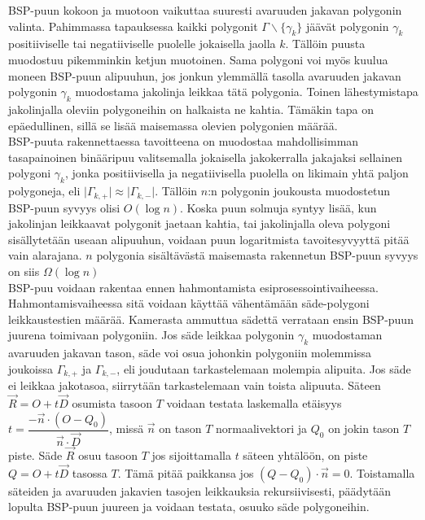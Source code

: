 \documentclass[a4paper, 12pt, titlepage]{article}
\newcommand{\abs}[1]{\vert #1 \vert} %
\begin{document}
BSP-puun kokoon ja muotoon vaikuttaa suuresti avaruuden jakavan polygonin valinta. Pahimmassa tapauksessa kaikki polygonit $\Gamma\backslash\{\gamma_k\}$ jäävät polygonin $\gamma_k$ positiiviselle tai negatiiviselle puolelle jokaisella jaolla $k$. Tällöin puusta muodostuu pikemminkin ketjun muotoinen. Sama polygoni voi myös kuulua moneen BSP-puun alipuuhun, jos jonkun ylemmällä tasolla avaruuden jakavan polygonin $\gamma_k$ muodostama jakolinja leikkaa tätä polygonia. \citep[.]{samet} Toinen lähestymistapa jakolinjalla oleviin polygoneihin on halkaista ne kahtia. Tämäkin tapa on epäedullinen, sillä se lisää maisemassa olevien polygonien määrää. \citep[.]{ranta}\\ %



BSP-puuta rakennettaessa tavoitteena on muodostaa mahdollisimman tasapainoinen binääripuu valitsemalla jokaisella jakokerralla jakajaksi sellainen polygoni $\gamma_k$, jonka positiivisella ja negatiivisella puolella on likimain yhtä paljon polygoneja, eli $\abs{\Gamma_{k,+}} \approx \abs{\Gamma_{k,-}}$. Tällöin  $n$:n polygonin joukousta muodostetun BSP-puun syvyys olisi $O(\log n)$. Koska puun solmuja syntyy lisää, kun jakolinjan leikkaavat polygonit jaetaan kahtia, tai jakolinjalla oleva polygoni sisällytetään useaan alipuuhun, voidaan puun logaritmista tavoitesyvyyttä pitää vain alarajana. \citep[.]{hughes} $n$ polygonia sisältävästä maisemasta rakennetun BSP-puun syvyys on siis $\Omega(\log n)$\\

BSP-puu voidaan rakentaa ennen hahmontamista esiprosessointivaiheessa. Hahmontamisvaiheessa sitä voidaan käyttää vähentämään säde-polygoni leikkaustestien määrää. Kamerasta ammuttua sädettä verrataan ensin BSP-puun juurena toimivaan polygoniin. Jos säde leikkaa polygonin $\gamma_k$ muodostaman avaruuden jakavan tason, säde voi osua johonkin polygoniin molemmissa joukoissa ${\Gamma_{k,+}}$ ja ${\Gamma_{k,-}}$, eli joudutaan tarkastelemaan molempia alipuita. Jos säde ei leikkaa jakotasoa, siirrytään tarkastelemaan vain toista alipuuta. Säteen $\vec{R}=O+t\vec{D}$ osumista tasoon $T$ voidaan testata laskemalla etäisyys $t=\dfrac{-\vec{n}\cdot(O-Q_0)}{\vec{n}\cdot\vec{D}}$, missä $\vec{n}$ on tason $T$ normaalivektori ja $Q_0$ on jokin tason $T$ piste. Säde $\vec{R}$ osuu tasoon $T$ jos sijoittamalla $t$ säteen yhtälöön, on piste $Q = O+t\vec{D}$ tasossa $T$. Tämä pitää paikkansa jos $(Q-Q_0)\cdot\vec{n} = 0$. \citep[.]{hughes} Toistamalla säteiden ja avaruuden jakavien tasojen leikkauksia rekursiivisesti, päädytään lopulta BSP-puun juureen ja voidaan testata, osuuko säde polygoneihin.\citep[.]{ranta}\\
\end{document}
